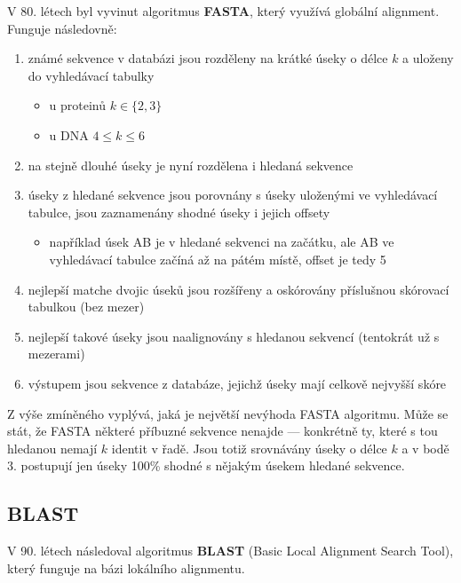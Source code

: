 \documentclass[DIV=8]{scrreprt}
\begin{document}
V 80. létech byl vyvinut algoritmus \textbf{FASTA}, který využívá globální alignment. Funguje následovně:
\begin{enumerate}[nosep]
    \item známé sekvence v databázi jsou rozděleny na krátké úseky o délce \(k\) a uloženy do vyhledávací tabulky
\begin{itemize}[nosep]
    \item u proteinů \(k \in \{2, 3\}\)
    \item u DNA \(4 \leq k \leq 6\)
\end{itemize}

    \item na stejně dlouhé úseky je nyní rozdělena i hledaná sekvence
    \item úseky z hledané sekvence jsou porovnány s úseky uloženými ve vyhledávací tabulce, jsou zaznamenány shodné úseky i jejich offsety
\begin{itemize}[nosep]
    \item například úsek AB je v hledané sekvenci na začátku, ale AB ve vyhledávací tabulce začíná až na pátém místě, offset je tedy 5
\end{itemize}

    \item nejlepší matche dvojic úseků jsou rozšířeny a oskórovány příslušnou skórovací tabulkou (bez mezer)
    \item nejlepší takové úseky jsou naalignovány s hledanou sekvencí (tentokrát už s mezerami)
    \item výstupem jsou sekvence z databáze, jejichž úseky mají celkově nejvyšší skóre
\end{enumerate}



Z výše zmíněného vyplývá, jaká je největší nevýhoda FASTA algoritmu. Může se stát, že FASTA některé příbuzné sekvence nenajde --- konkrétně ty, které s tou hledanou nemají \(k\) identit v řadě. Jsou totiž srovnávány úseky o délce \(k\) a v bodě 3. postupují jen úseky 100\% shodné s nějakým úsekem hledané sekvence.

\subsection{BLAST} \label{BLAST}


V 90. létech následoval algoritmus \textbf{BLAST} (Basic Local Alignment Search Tool), který funguje na bázi lokálního alignmentu.
\end{document}
